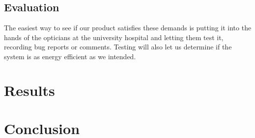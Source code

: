 \documentclass[12pt,a4paper,notitlepage]{report}
\begin{document}
\section{Evaluation} %
The easiest way to see if our product satisfies these demands is putting it into the hands of the opticians at the university hospital and letting them test it, recording bug reports or comments. Testing will also let us determine if the system is as energy efficient as we intended.


\chapter{Results}

\chapter{Conclusion}







\end{document}

